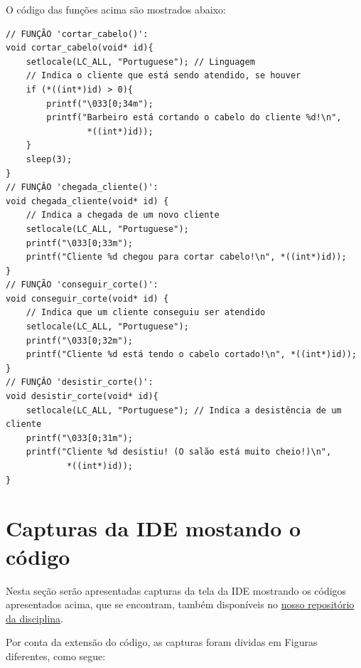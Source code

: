 \documentclass[
	12pt,				%
	openright,			%
	oneside,			%
	a4paper,			%
	chapter=TITLE,		%
	english,			%
	french,				%
	spanish,			%
	brazil				%
	]{abntex2}
\theoremstyle{definition}
\begin{document}
O código das funções acima são mostrados abaixo:

\begin{verbatim}
// FUNÇÃO 'cortar_cabelo()':
void cortar_cabelo(void* id){
    setlocale(LC_ALL, "Portuguese"); // Linguagem
    // Indica o cliente que está sendo atendido, se houver
    if (*((int*)id) > 0){ 
        printf("\033[0;34m");
        printf("Barbeiro está cortando o cabelo do cliente %d!\n", 
                *((int*)id));
    }
    sleep(3);
}
// FUNÇÂO 'chegada_cliente()':
void chegada_cliente(void* id) {
    // Indica a chegada de um novo cliente
    setlocale(LC_ALL, "Portuguese"); 
    printf("\033[0;33m");
    printf("Cliente %d chegou para cortar cabelo!\n", *((int*)id));
}
// FUNÇÃO 'conseguir_corte()':
void conseguir_corte(void* id) {
    // Indica que um cliente conseguiu ser atendido
    setlocale(LC_ALL, "Portuguese");
    printf("\033[0;32m");
    printf("Cliente %d está tendo o cabelo cortado!\n", *((int*)id));
}
// FUNÇÂO 'desistir_corte()':
void desistir_corte(void* id){
    setlocale(LC_ALL, "Portuguese"); // Indica a desistência de um cliente
    printf("\033[0;31m");
    printf("Cliente %d desistiu! (O salão está muito cheio!)\n", 
            *((int*)id));
}
\end{verbatim}

\section{Capturas da IDE mostando o código}
Nesta seção serão apresentadas capturas da tela da IDE mostrando os códigos apresentados acima, que se encontram, também disponíveis no
\href{https://github.com/jvictorferreira3301/Sistemas_Operacionais}{nosso repositório da disciplina}.

Por conta da extensão do código, as capturas foram dividas em Figuras diferentes, como segue:
\end{document}

